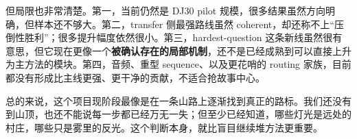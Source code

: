 \documentclass[11pt]{ctexart}
\begin{document}
但局限也非常清楚。第一，当前仍然是 DJ30 pilot 规模，很多结果虽然方向明确，但样本还不够大。第二，transfer 侧最强路线虽然 coherent，却还称不上“压倒性胜利”；很多提升幅度依然很小。第三，hardest-question 这条新线虽然很有意思，但它现在更像一个\textbf{被确认存在的局部机制}，还不是已经成熟到可以直接上升为主方法的模块。第四，音频、重型 sequence、以及更花哨的 routing 家族，目前都没有形成比主线更强、更干净的贡献，不适合抢故事中心。

总的来说，这个项目现阶段最像是在一条山路上逐渐找到真正的路标。我们还没有到山顶，也还不能说每一步都已经万无一失；但至少已经知道，哪些灯光是远处的村庄，哪些只是雾里的反光。这个判断本身，就比盲目继续堆方法更重要。
\end{document}
